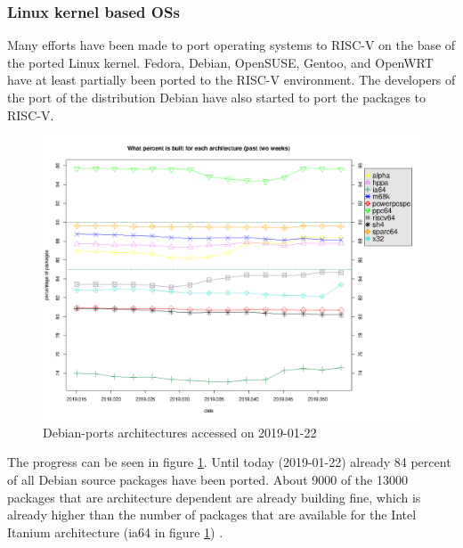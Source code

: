 \subsubsection{Linux kernel based OSs}
Many efforts have been made to port operating systems
to RISC-V on the base of the ported Linux kernel.
Fedora, Debian, OpenSUSE, Gentoo, and OpenWRT have at least
partially been ported to the RISC-V
environment. The developers of the port of the
distribution Debian have also started to port
the packages to RISC-V.
\begin{figure}
    \centering
    \includegraphics[width=1\textwidth]{figures/graph-ports-week-big}
    \caption{Debian-ports architectures
        \cite["Two weeks report"]{debian_debian-ports_architectures} accessed on 2019-01-22}
    \label{fig:graph-ports-week-big}
\end{figure}
The progress can be seen in figure
\ref{fig:graph-ports-week-big}. Until today
(2019-01-22) already 84 percent of all
Debian source packages have been ported.
About 9000 of the 13000 packages that are architecture
dependent are already building fine, which is already
higher than the number of packages that are available
for the Intel Itanium architecture 
(ia64 in figure \ref{fig:graph-ports-week-big})
\cite[min.~5:35]{youtube_linux_kernel_current_status}.

